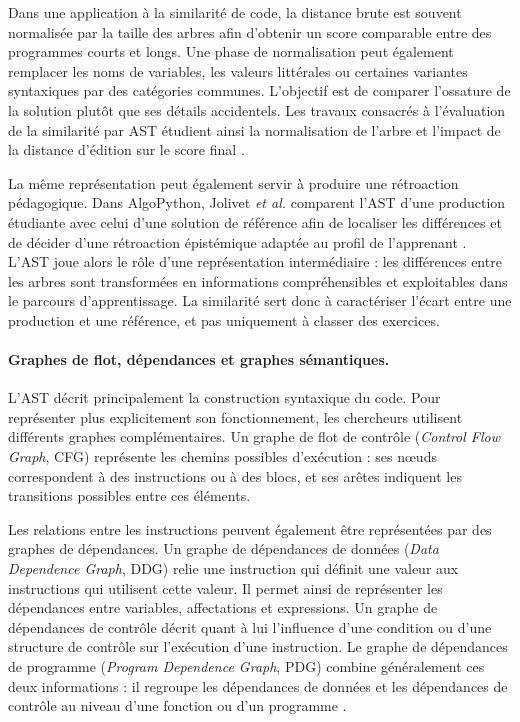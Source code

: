 \documentclass[12pt,a4paper,oneside]{report}
\begin{document}
Dans une application à la similarité de code, la distance brute est souvent
normalisée par la taille des arbres afin d'obtenir un score comparable entre
des programmes courts et longs. Une phase de normalisation peut également
remplacer les noms de variables, les valeurs littérales ou certaines
variantes syntaxiques par des catégories communes. L'objectif est de
comparer l'ossature de la solution plutôt que ses détails accidentels. Les
travaux consacrés à l'évaluation de la similarité par AST étudient ainsi la
normalisation de l'arbre et l'impact de la distance d'édition sur le score
final \cite{song_revisiting_2024}.

La même représentation peut également servir à produire une rétroaction
pédagogique. Dans AlgoPython, Jolivet \emph{et al.} comparent l'AST d'une
production étudiante avec celui d'une solution de référence afin de localiser
les différences et de décider d'une rétroaction épistémique adaptée au profil
de l'apprenant \cite{jolivet_modelisation_2025}. L'AST joue alors le rôle
d'une représentation intermédiaire : les différences entre les arbres sont
transformées en informations compréhensibles et exploitables dans le parcours
d'apprentissage. La similarité sert donc à caractériser l'écart entre une
production et une référence, et pas uniquement à classer des exercices.

\paragraph{Graphes de flot, dépendances et graphes sémantiques.}

L'AST décrit principalement la construction syntaxique du code. Pour
représenter plus explicitement son fonctionnement, les chercheurs utilisent
différents graphes complémentaires. Un graphe de flot de contrôle
(\emph{Control Flow Graph}, CFG) représente les chemins possibles
d'exécution : ses nœuds correspondent à des instructions ou à des blocs, et
ses arêtes indiquent les transitions possibles entre ces éléments.

Les relations entre les instructions peuvent également être représentées par
des graphes de dépendances. Un graphe de dépendances de données
(\emph{Data Dependence Graph}, DDG) relie une instruction qui définit une
valeur aux instructions qui utilisent cette valeur. Il permet ainsi de
représenter les dépendances entre variables, affectations et expressions. Un
graphe de dépendances de contrôle décrit quant à lui l'influence d'une
condition ou d'une structure de contrôle sur l'exécution d'une instruction.
Le graphe de dépendances de programme (\emph{Program Dependence Graph},
PDG) combine généralement ces deux informations : il regroupe les
dépendances de données et les dépendances de contrôle au niveau d'une
fonction ou d'un programme \cite{xiang_graph_2024,reddy_graph-based_2025}.
\end{document}
